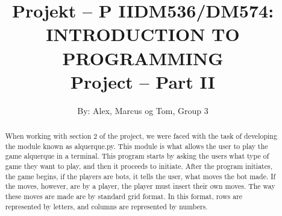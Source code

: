 \documentclass[12pt]{article}
\title{Projekt – P II}
\title{DM536/DM574: INTRODUCTION TO PROGRAMMING \\ Project – Part II}
\author{By: Alex, Marcus og Tom, Group 3}
\begin{document}
\maketitle

\begin{abstract}
When working with section 2 of the project, we were faced with the task of developing the module known as alquerque.py. This module is what allows the user to play the game alquerque in a terminal. This program starts by asking the users what type of game they want to play, and then it proceeds to initiate. After the program initiates, the game begins, if the players are bots, it tells the user, what moves the bot made. If the moves, however, are by a player, the player must insert their own moves. The way these moves are made are by standard grid format. In this format, rows are represented by letters, and columns are represented by numbers.
\end{abstract}

\section{}
\end{document}
